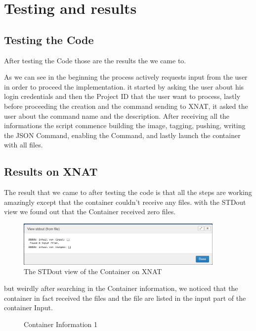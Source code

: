 
\chapter{Testing and results}
\section{Testing the Code}
After testing the Code those are the results the we came to. 

 As we can see in the beginning  the process actively requests input from the user in order to proceed the implementation. it started by asking the user about his login credentials and then the Project ID that the user want to process, lastly before proceeding the creation and the command sending to XNAT, it asked the user about the command name and the description.
 After receiving  all the informations the script commence building the image, tagging, pushing, writing the JSON Command, enabling the Command, and lastly launch the container with all files.


 
 \section{Results on XNAT}
 The result that we came to after testing the code is that all the steps are working amazingly except that the container couldn't receive any files. with the \ac{STDout} view we found out that the Container received zero files. 
 
 \begin{figure}
    \centering
    \includegraphics[width=0.9\textwidth]{en/content/STDOUT view.png}
    \caption{The STDout view of the Container on XNAT}
    \label{fig:enter-label}
\end{figure}

but weirdly after searching in the Container information, we noticed that the container in fact received the files and the file are listed in the input part of the container Input. 


\begin{figure}[p]
    \centering
    \caption{Container Information 1}
    \label{fig:container-info-1}
\end{figure}


